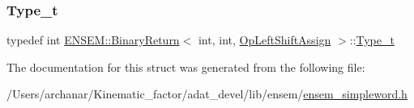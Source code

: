 \mbox{\label{structENSEM_1_1BinaryReturn_3_01int_00_01int_00_01OpLeftShiftAssign_01_4_abe15562b5780c9ed9e3357639d2843ba}} 
\subsubsection{\texorpdfstring{Type\_t}{Type\_t}\hspace{0.1cm}{\footnotesize\ttfamily [2/2]}}
{\footnotesize\ttfamily typedef int \mbox{\hyperlink{structENSEM_1_1BinaryReturn}{E\+N\+S\+E\+M\+::\+Binary\+Return}}$<$ int, int, \mbox{\hyperlink{structENSEM_1_1OpLeftShiftAssign}{Op\+Left\+Shift\+Assign}} $>$\+::\mbox{\hyperlink{structENSEM_1_1BinaryReturn_3_01int_00_01int_00_01OpLeftShiftAssign_01_4_abe15562b5780c9ed9e3357639d2843ba}{Type\+\_\+t}}}



The documentation for this struct was generated from the following file\+:\begin{DoxyCompactItemize}
\item 
/\+Users/archanar/\+Kinematic\+\_\+factor/adat\+\_\+devel/lib/ensem/\mbox{\hyperlink{lib_2ensem_2ensem__simpleword_8h}{ensem\+\_\+simpleword.\+h}}\end{DoxyCompactItemize}
